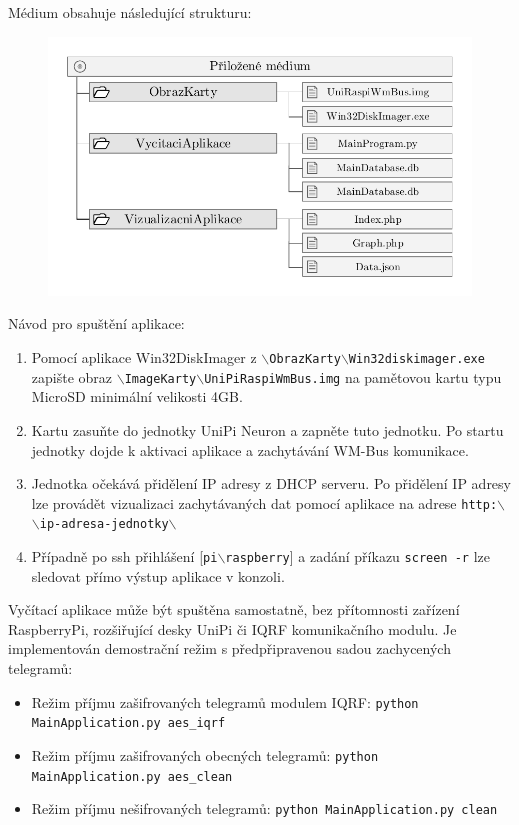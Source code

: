 \vspace{10pt}
Médium obsahuje následující strukturu: 
\vspace{-20pt}
	 \begin{figure}[!h]
  \begin{center}
    \includegraphics[scale=0.8]{obrazky/priloha_medium}
  \end{center}
	\vspace{-30pt}
\end{figure}

Návod pro spuštění aplikace:
		\begin{enumerate}
			\item Pomocí aplikace Win32DiskImager z \texttt{$\backslash$ObrazKarty$\backslash$Win32diskimager.exe} zapište obraz \texttt{$\backslash$ImageKarty$\backslash$UniPiRaspiWmBus.img} na pamětovou kartu typu MicroSD minimální velikosti 4GB.
			\item Kartu zasuňte do jednotky UniPi Neuron a zapněte tuto jednotku. Po startu jednotky dojde k aktivaci aplikace a zachytávání WM-Bus komunikace.
			\item Jednotka očekává přidělení IP adresy z DHCP serveru. Po přidělení IP adresy lze provádět vizualizaci zachytávaných dat pomocí aplikace na adrese \texttt{http:$\backslash$$\backslash$ip-adresa-jednotky$\backslash$}
			\item Případně po ssh přihlášení [\texttt{pi$\backslash$raspberry}] a zadání příkazu \texttt{screen -r} lze sledovat přímo výstup aplikace v konzoli.
		\end{enumerate}

	\vspace{10pt}
Vyčítací aplikace může být spuštěna samostatně, bez přítomnosti zařízení RaspberryPi, rozšiřující desky UniPi či IQRF komunikačního modulu. Je implementován demostrační režim s předpřipravenou sadou zachycených telegramů:
\begin{itemize}
	\item Režim příjmu zašifrovaných telegramů modulem IQRF: \texttt{python MainApplication.py aes\_iqrf}
	\item Režim příjmu zašifrovaných obecných telegramů: \texttt{python MainApplication.py aes\_clean}
	\item Režim příjmu nešifrovaných telegramů: \texttt{python MainApplication.py clean}
\end{itemize}


